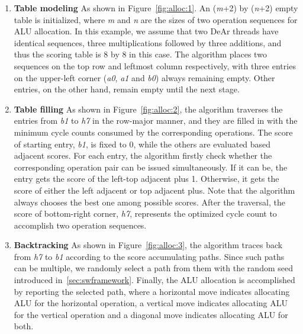 \begin{enumerate}
    \item \textbf{Table modeling} As shown in Figure~\ref{fig:alloc:1}. An (\textit{m}+2) by (\textit{n}+2) empty table is initialized, 
        where \textit{m} and \textit{n} are the sizes of two operation sequences for ALU allocation.
        In this example, we assume that two DeAr threads have identical sequences, three multiplications followed by three additions, 
        and thus the scoring table is 8 by 8 in this case.
        The algorithm places two sequences on the top row and leftmost column respectively, 
        with three entries on the upper-left corner (\textit{a0}, \textit{a1} and \textit{b0}) always remaining empty. 
        Other entries, on the other hand, remain empty until the next stage.
    \item \textbf{Table filling} As shown in Figure~\ref{fig:alloc:2}, the algorithm traverses the entries from \textit{b1} to \textit{h7} in the row-major manner, 
        and they are filled in with the minimum cycle counts consumed by the corresponding operations.
        The score of starting entry, \textit{b1}, is fixed to 0, while the others are evaluated based adjacent scores.
        For each entry, the algorithm firstly check whether the corresponding operation pair can be issued simultaneously.
        If it can be, the entry gets the score of the left-top adjacent plus 1.
        Otherwise, it gets the score of either the left adjacent or top adjacent plus.
        Note that the algorithm always chooses the best one among possible scores.
        After the traversal, the score of bottom-right corner, \textit{h7}, represents the optimized cycle count to accomplish two operation sequences.
    \item \textbf{Backtracking} As shown in Figure~\ref{fig:alloc:3}, the algorithm traces back from \textit{h7} to \textit{b1} according to the score accumulating paths.
        Since such paths can be multiple, we randomly select a path from them with the random seed introduced in~\ref{sec:swframework}.
        Finally, the ALU allocation is accomplished by reporting the selected path, 
        where a horizontal move indicates allocating ALU for the horizontal operation,
        a vertical move indicates allocating ALU for the vertical operation and a diagonal move indicates allocating ALU for both.
\end{enumerate}
\vspace{\textfig}
